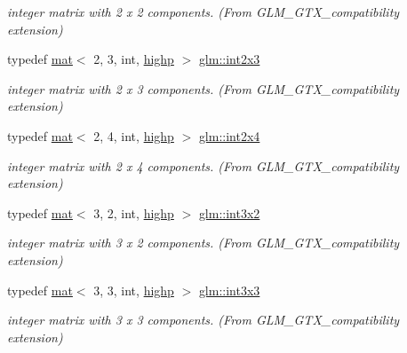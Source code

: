 \begin{DoxyCompactItemize}
\begin{DoxyCompactList}\small\item\em integer matrix with 2 x 2 components. (From G\+L\+M\+\_\+\+G\+T\+X\+\_\+compatibility extension) \end{DoxyCompactList}\item 
typedef \hyperlink{structglm_1_1mat}{mat}$<$ 2, 3, int, \hyperlink{namespaceglm_a36ed105b07c7746804d7fdc7cc90ff25ac6f7eab42eacbb10d59a58e95e362074}{highp} $>$ \hyperlink{group__gtx__compatibility_ga13c7e3ba6d19765d8877cccf05c2e520}{glm\+::int2x3}
\begin{DoxyCompactList}\small\item\em integer matrix with 2 x 3 components. (From G\+L\+M\+\_\+\+G\+T\+X\+\_\+compatibility extension) \end{DoxyCompactList}\item 
typedef \hyperlink{structglm_1_1mat}{mat}$<$ 2, 4, int, \hyperlink{namespaceglm_a36ed105b07c7746804d7fdc7cc90ff25ac6f7eab42eacbb10d59a58e95e362074}{highp} $>$ \hyperlink{group__gtx__compatibility_gab5fea62bdc861a2b0dd5ae6147b88975}{glm\+::int2x4}
\begin{DoxyCompactList}\small\item\em integer matrix with 2 x 4 components. (From G\+L\+M\+\_\+\+G\+T\+X\+\_\+compatibility extension) \end{DoxyCompactList}\item 
typedef \hyperlink{structglm_1_1mat}{mat}$<$ 3, 2, int, \hyperlink{namespaceglm_a36ed105b07c7746804d7fdc7cc90ff25ac6f7eab42eacbb10d59a58e95e362074}{highp} $>$ \hyperlink{group__gtx__compatibility_ga3e01f29f95467e49bdfd1b000420d13e}{glm\+::int3x2}
\begin{DoxyCompactList}\small\item\em integer matrix with 3 x 2 components. (From G\+L\+M\+\_\+\+G\+T\+X\+\_\+compatibility extension) \end{DoxyCompactList}\item 
typedef \hyperlink{structglm_1_1mat}{mat}$<$ 3, 3, int, \hyperlink{namespaceglm_a36ed105b07c7746804d7fdc7cc90ff25ac6f7eab42eacbb10d59a58e95e362074}{highp} $>$ \hyperlink{group__gtx__compatibility_gac7c574e682731013783283d875602224}{glm\+::int3x3}
\begin{DoxyCompactList}\small\item\em integer matrix with 3 x 3 components. (From G\+L\+M\+\_\+\+G\+T\+X\+\_\+compatibility extension) \end{DoxyCompactList}\item 

\end{DoxyCompactItemize}

